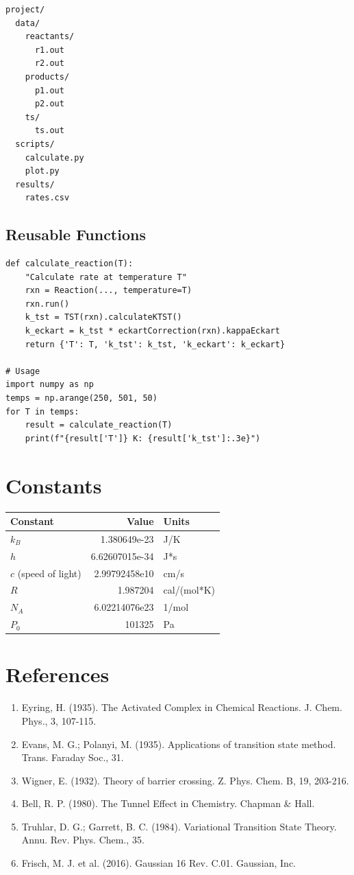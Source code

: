 \documentclass[11pt,a4paper]{book}
\begin{document}
\begin{lstlisting}[language=bash]
project/
  data/
    reactants/
      r1.out
      r2.out
    products/
      p1.out
      p2.out
    ts/
      ts.out
  scripts/
    calculate.py
    plot.py
  results/
    rates.csv
\end{lstlisting}

\section{Reusable Functions}

\begin{lstlisting}
def calculate_reaction(T):
    "Calculate rate at temperature T"
    rxn = Reaction(..., temperature=T)
    rxn.run()
    k_tst = TST(rxn).calculateKTST()
    k_eckart = k_tst * eckartCorrection(rxn).kappaEckart
    return {'T': T, 'k_tst': k_tst, 'k_eckart': k_eckart}

# Usage
import numpy as np
temps = np.arange(250, 501, 50)
for T in temps:
    result = calculate_reaction(T)
    print(f"{result['T']} K: {result['k_tst']:.3e}")
\end{lstlisting}

\appendix

\chapter{Constants}

\begin{longtable}{lrl}
\toprule
\textbf{Constant} & \textbf{Value} & \textbf{Units} \\
\midrule
\endhead
$k_B$ & 1.380649e-23 & J/K \\
$h$ & 6.62607015e-34 & J*s \\
$c$ (speed of light) & 2.99792458e10 & cm/s \\
$R$ & 1.987204 & cal/(mol*K) \\
$N_A$ & 6.02214076e23 & 1/mol \\
$P_0$ & 101325 & Pa \\
\bottomrule
\end{longtable}

\chapter{References}

\begin{enumerate}
  \item Eyring, H. (1935). The Activated Complex in Chemical Reactions. J. Chem. Phys., 3, 107-115.
  \item Evans, M. G.; Polanyi, M. (1935). Applications of transition state method. Trans. Faraday Soc., 31.
  \item Wigner, E. (1932). Theory of barrier crossing. Z. Phys. Chem. B, 19, 203-216.
  \item Bell, R. P. (1980). The Tunnel Effect in Chemistry. Chapman \& Hall.
  \item Truhlar, D. G.; Garrett, B. C. (1984). Variational Transition State Theory. Annu. Rev. Phys. Chem., 35.
  \item Frisch, M. J. et al. (2016). Gaussian 16 Rev. C.01. Gaussian, Inc.
\end{enumerate}
\end{document}
